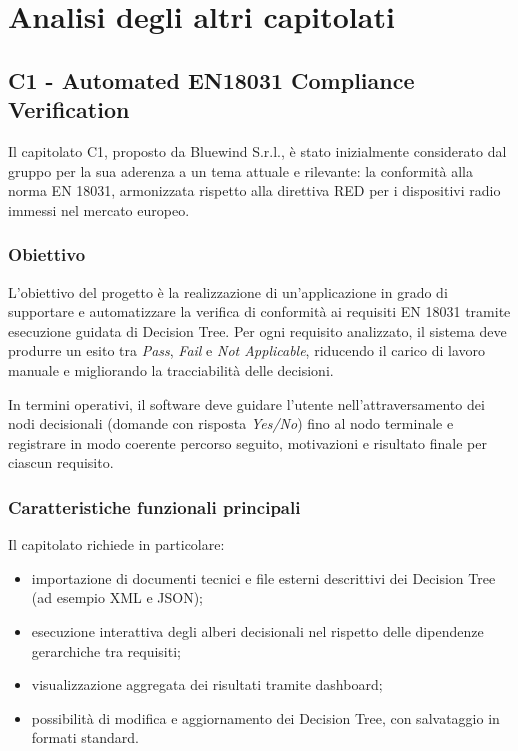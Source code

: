 \documentclass[a4paper,12pt]{article}
\begin{document}
\section{Analisi degli altri capitolati}
\subsection{C1 - Automated EN18031 Compliance Verification}

Il capitolato C1, proposto da Bluewind S.r.l., è stato inizialmente considerato dal gruppo per la sua aderenza a un tema attuale e rilevante: la conformità alla norma EN 18031, armonizzata rispetto alla direttiva RED per i dispositivi radio immessi nel mercato europeo.


\subsubsection{Obiettivo}

L'obiettivo del progetto è la realizzazione di un'applicazione in grado di supportare e automatizzare la verifica di conformità ai requisiti EN 18031 tramite esecuzione guidata di Decision Tree. Per ogni requisito analizzato, il sistema deve produrre un esito tra \textit{Pass}, \textit{Fail} e \textit{Not Applicable}, riducendo il carico di lavoro manuale e migliorando la tracciabilità delle decisioni.

In termini operativi, il software deve guidare l'utente nell'attraversamento dei nodi decisionali (domande con risposta \textit{Yes/No}) fino al nodo terminale e registrare in modo coerente percorso seguito, motivazioni e risultato finale per ciascun requisito.

\subsubsection{Caratteristiche funzionali principali}

Il capitolato richiede in particolare:

\begin{itemize}
    \item importazione di documenti tecnici e file esterni descrittivi dei Decision Tree (ad esempio XML e JSON);
    \item esecuzione interattiva degli alberi decisionali nel rispetto delle dipendenze gerarchiche tra requisiti;
    \item visualizzazione aggregata dei risultati tramite dashboard;
    \item possibilità di modifica e aggiornamento dei Decision Tree, con salvataggio in formati standard.
\end{itemize}
\end{document}
